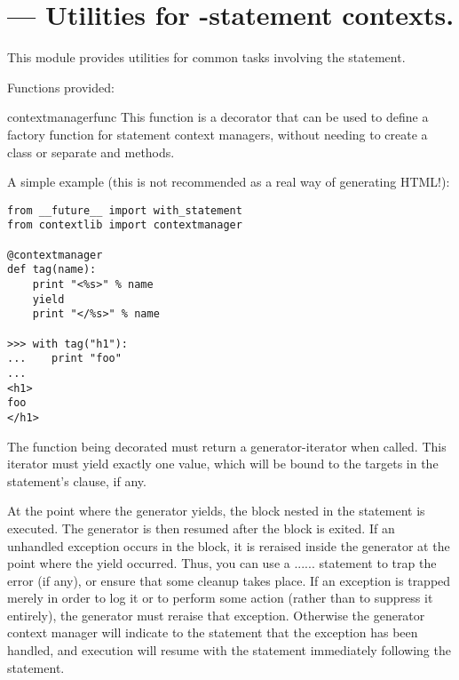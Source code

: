 \section{ ---
         Utilities for -statement contexts.}



This module provides utilities for common tasks involving the
 statement.

Functions provided:

\begin{funcdesc}{contextmanager}{func}
This function is a decorator that can be used to define a factory
function for  statement context managers, without
needing to create a class or separate  and
 methods.

A simple example (this is not recommended as a real way of
generating HTML!):

\begin{verbatim}
from __future__ import with_statement
from contextlib import contextmanager

@contextmanager
def tag(name):
    print "<%s>" % name
    yield
    print "</%s>" % name

>>> with tag("h1"):
...    print "foo"
...
<h1>
foo
</h1>
\end{verbatim}

The function being decorated must return a generator-iterator when
called. This iterator must yield exactly one value, which will be
bound to the targets in the  statement's 
clause, if any.

At the point where the generator yields, the block nested in the
 statement is executed.  The generator is then resumed
after the block is exited.  If an unhandled exception occurs in the
block, it is reraised inside the generator at the point where the yield
occurred.  Thus, you can use a
...... statement to trap
the error (if any), or ensure that some cleanup takes place. If an
exception is trapped merely in order to log it or to perform some
action (rather than to suppress it entirely), the generator must
reraise that exception. Otherwise the generator context manager will
indicate to the  statement that the exception has been
handled, and execution will resume with the statement immediately
following the  statement.
\end{funcdesc}

